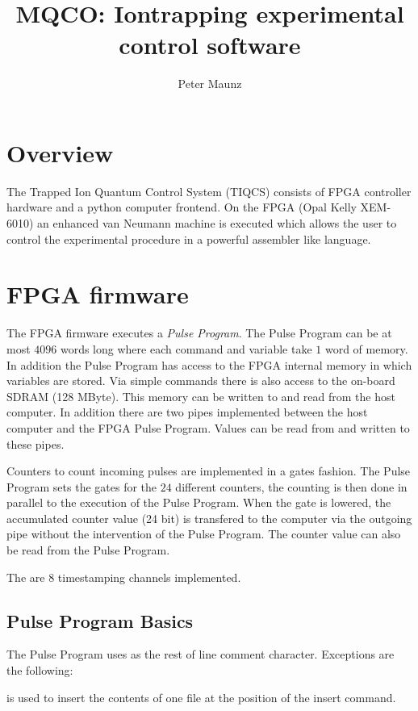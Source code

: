 \documentclass[11pt]{scrartcl}
\author{Peter Maunz}
\title{MQCO: Iontrapping experimental control software}
\newcommand{\declaration}[2]{\vspace*{2ex}#1\begin{addmargin}{1cm}{#2}\end{addmargin}}
\begin{document}
\maketitle

\section{Overview}
The Trapped Ion Quantum Control System (TIQCS) consists of FPGA controller hardware and a python computer frontend. On the FPGA (Opal Kelly XEM-6010) an enhanced van Neumann machine is executed which allows the user to control the experimental procedure in a powerful assembler like language.

\section{FPGA firmware}

%

The FPGA firmware executes a {\it Pulse Program}. The Pulse Program can be at most $4096$ words long where each command and variable take $1$ word of memory. In addition the Pulse Program has access to the FPGA internal memory in which variables are stored. Via simple commands there is also access to the on-board SDRAM (128 MByte). This memory can be written to and read from the host computer. In addition there are two pipes implemented between the host computer and the FPGA Pulse Program. Values can be read from and written to these pipes.

Counters to count incoming pulses are implemented in a gates fashion. The Pulse Program sets the gates for the $24$ different counters, the counting is then done in parallel to the execution of the Pulse Program. When the gate is lowered, the accumulated counter value (24 bit) is transfered to the computer via the outgoing pipe without the intervention of the Pulse Program. The counter value can also be read from the Pulse Program.

The are $8$ timestamping channels implemented.

\subsection{Pulse Program Basics}
The Pulse Program uses \lit{\#} as the rest of line comment character. Exceptions are the following:

\declaration{ }{is used to insert the contents of one file at the position of the insert command.}
\end{document}
